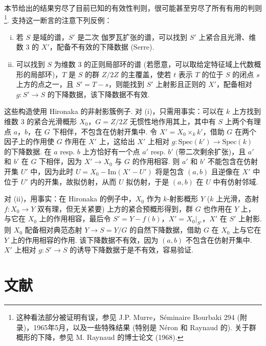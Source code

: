 \begin{remark}\label{rem:VIII.7.10}
本节给出的结果穷尽了目前已知的有效性判则，很可能甚至穷尽了所有有用的判则\footnote{这种看法部分被证明有误，参见 J.P. Murre，Séminaire Bourbaki 294 (附录)，1965年5月，以及一些特殊结果 (特别是 Néron 和 Raynaud 的). 关于群概形的下降，参见 M. Raynaud 的博士论文 (1968).}. 支持这一断言的注意下列反例：
\begin{enumerate}[i)]
\item 若 $S$ 是域的谱，$S'$ 是二次 伽罗瓦扩张的谱，可以找到 $S'$ 上紧合且光滑、维数 3 的 $X'$，配备不有效的下降数据 (Serre).
\item 可以找到 $S$ 为维数 3 的正则局部环的谱 (若愿意，可以取给定特征域上代数概形的局部环)，$T$ 是 $S$ 的群 $Z/2Z$ 的主覆盖，使若 $t$ 表示 $T$ 的位于 $S$ 的闭点 $s$ 上方的点之一，且 $S' = T - s$，则能找到 $S'$ 上射影且正则的 $X'$，配备相对 $g \colon S' \to S$ 的下降数据，该下降数据不有效.
\end{enumerate}
这些构造使用 Hironaka 的非射影簇例子. 对 (i)，只需用事实：可以在 $k$ 上方找到维数 3 的紧合光滑概形 $X_0$，$G = Z/2Z$ 无惯性地作用其上，其中有 $S$ 上两个有理点 $a$，$b$，在 $G$ 下相伴，不包含在仿射开集中. 令 $X' = X_0 \times_k k'$，借助 $G$ 在两个因子上的作用使 $G$ 作用在 $X'$ 上，这给出 $X'$ 上相对 $g \colon \mathrm{Spec}(k') \to \mathrm{Spec}(k)$ 的下降数据. 在 $a$ resp. $b$ 上方恰好有一个点 $a'$ resp. $b'$ (带二次剩余扩张)，且 $a'$ 和 $b'$ 在 $G$ 下相伴，因为 $X' \to X_0$ 与 $G$ 的作用相容. 则 $a'$ 和 $b'$ 不能包含在仿射开集 $U'$ 中，因为此时 $U = X_0 - \mathrm{Im}(X' - U')$ 将是包含 $(a, b)$ 且逆像在 $X'$ 中位于 $U'$ 内的开集，故拟仿射，从而 $U$ 拟仿射，于是 $(a, b)$ 在 $U$ 中有仿射邻域.

对 (ii)，用事实：在 Hironaka 的例子中，$X_0$ 作为 $k$-射影概形 $Y$ ($k$ 上光滑，态射 $f \colon X_0 \to Y$ 双有理，但无关紧要) 上方的紧合预概形得到，群 $G$ 也作用在 $Y$ 上，与它在 $X_0$ 上的作用相容，最后令 $S' = Y - f(b)$，$X' = X_0|_{S'}$，$X'$ 在 $S'$ 上射影. 则 $X_0$ 配备相对典范态射 $Y \to S = Y/G$ 的自然下降数据，借助 $G$ 在 $X_0$ 上与它在 $Y$ 上的作用相容的作用. 该下降数据不有效，因为 $(a, b)$ 不包含在仿射开集中. $X'$ 上相对 $g \colon S' \to S$ 的诱导下降数据于是不有效，容易验证.
\end{remark}

\section{文献}\printbibliography[heading=none]


